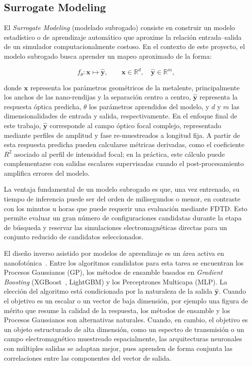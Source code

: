 \subsection{Surrogate Modeling}\label{subsec:surrogate}

El \textit{Surrogate Modeling} (modelado subrogado) consiste en construir un modelo estadístico o de aprendizaje automático que aproxime la relación entrada--salida de un simulador computacionalmente costoso. En el contexto de este proyecto, el modelo subrogado busca aprender un mapeo aproximado de la forma:

\begin{equation}
    f_{\theta}: \mathbf{x} \mapsto \hat{\mathbf{y}}, \qquad \mathbf{x} \in \mathbb{R}^d, \quad \hat{\mathbf{y}} \in \mathbb{R}^m,
    \label{eq:surrogate}
\end{equation}

\noindent donde $\mathbf{x}$ representa los parámetros geométricos de la metalente, principalmente los anchos de las nano-rendijas y la separación centro a centro, $\hat{\mathbf{y}}$ representa la respuesta óptica predicha, $\theta$ los parámetros aprendidos del modelo, y $d$ y $m$ las dimensionalidades de entrada y salida, respectivamente. En el enfoque final de este trabajo, $\hat{\mathbf{y}}$ corresponde al campo óptico focal complejo, representado mediante perfiles de amplitud y fase re-muestreados a longitud fija. A partir de esta respuesta predicha pueden calcularse métricas derivadas, como el coeficiente $R^2$ asociado al perfil de intensidad focal; en la práctica, este cálculo puede complementarse con salidas escalares supervisadas cuando el post-procesamiento amplifica errores del modelo.

La ventaja fundamental de un modelo subrogado es que, una vez entrenado, su tiempo de inferencia puede ser del orden de milisegundos o menor, en contraste con los minutos u horas que puede requerir una evaluación mediante FDTD. Esto permite evaluar un gran número de configuraciones candidatas durante la etapa de búsqueda y reservar las simulaciones electromagnéticas directas para un conjunto reducido de candidatos seleccionados.

El diseño inverso asistido por modelos de aprendizaje es un área activa en nanofotónica~\cite{molesky2018inverse}. Entre los algoritmos candidatos para esta tarea se encuentran los Procesos Gaussianos (GP), los métodos de ensamble basados en \textit{Gradient Boosting} (XGBoost~\cite{chen2016xgboost}, LightGBM) y los Perceptrones Multicapa (MLP). La elección del algoritmo está condicionada por la naturaleza de la salida $\hat{\mathbf{y}}$. Cuando el objetivo es un escalar o un vector de baja dimensión, por ejemplo una figura de mérito que resume la calidad de la respuesta, los métodos de ensamble y los Procesos Gaussianos son alternativas naturales. Cuando, en cambio, el objetivo es un objeto estructurado de alta dimensión, como un espectro de transmisión o un campo electromagnético muestreado espacialmente, las arquitecturas neuronales con múltiples salidas se adaptan mejor, pues aprenden de forma conjunta las correlaciones entre las componentes del vector de salida.

